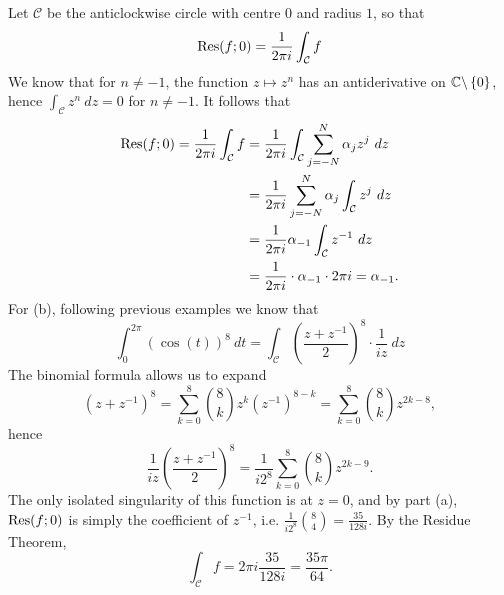 \begin{questions}
\begin{answer}
Let $\mathcal{C}$ be the anticlockwise circle with centre $0$ and radius $1$, so that
\[
\mathrm{Res} (f;0) = \frac{1}{2\pi i} \int_{\mathcal{C}} f
\]
We know that for $n \neq -1$, the function $z \mapsto z^n$ has an antiderivative on $\mathbb{C} \backslash \left\{0\right\}$, hence  $\displaystyle \int_{\mathcal{C}} z^n\ dz =0$ for $n \neq -1$.  It follows that
\begin{align*}
\Res (f;0)  = \frac{1}{2\pi i}\int_{\mathcal{C}} f & = \frac{1}{2\pi i} \int_{\mathcal{C}} \sum_{j=-N}^N \alpha_j z^j\ dz \\
& = \frac{1}{2\pi i} \sum_{j=-N}^N \alpha_j \int_{\mathcal{C}} z^j\ dz \\
& = \frac{1}{2\pi i} \alpha_{-1} \int_{\mathcal{C}}  z^{-1}\ dz \\
& =  \frac{1}{2\pi i} \cdot \alpha_{-1} \cdot 2\pi i = \alpha_{-1}.
\end{align*}
For (b), following previous examples we know that
\[
\int_0^{2\pi} \left( \cos(t) \right)^{8}\ dt = \int_{\mathcal{C}} \left( \frac{z+z^{-1}}{2} \right)^8 \cdot \frac{1}{iz}\ dz
\]
The binomial formula allows us to expand
\[
(z+z^{-1})^8 = \sum_{k=0}^8\binom{8}{k} z^k(z^{-1})^{8-k} = \sum_{k=0}^8\binom{8}{k} z^{2k-8},
\]
hence
\[
\frac{1}{iz} \left( \frac{z+z^{-1}}{2} \right)^8 = \frac{1}{i2^8} \sum_{k=0}^8\binom{8}{k} z^{2k-9}.
\]
The only isolated singularity of this function is at $z=0$, and by part (a), $\mathrm{Res}(f;0)$ is simply the coefficient of $z^{-1}$, i.e. $\frac{1}{i2^8}\binom{8}{4} =\frac{35}{128i}$.  By the Residue Theorem,
\[
\int_{\mathcal{C}} f = 2\pi i \frac{35}{128i} = \frac{35\pi}{64}.
\] 
\end{answer}

\end{questions}